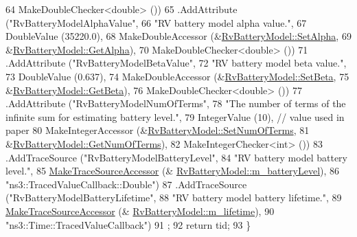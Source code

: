 \begin{DoxyCode}
64                    MakeDoubleChecker<double> ())
65     .AddAttribute (\textcolor{stringliteral}{"RvBatteryModelAlphaValue"},
66                    \textcolor{stringliteral}{"RV battery model alpha value."},
67                    DoubleValue (35220.0),
68                    MakeDoubleAccessor (&\hyperlink{classns3_1_1RvBatteryModel_ab7ed42697329357ed95a18cf2ec0d5d9}{RvBatteryModel::SetAlpha},
69                                        &\hyperlink{classns3_1_1RvBatteryModel_a91cdabc79e3f2a6facfe95202fa77e34}{RvBatteryModel::GetAlpha}),
70                    MakeDoubleChecker<double> ())
71     .AddAttribute (\textcolor{stringliteral}{"RvBatteryModelBetaValue"},
72                    \textcolor{stringliteral}{"RV battery model beta value."},
73                    DoubleValue (0.637),
74                    MakeDoubleAccessor (&\hyperlink{classns3_1_1RvBatteryModel_a82f89a01a1f487d3a71e9e21e5322286}{RvBatteryModel::SetBeta},
75                                        &\hyperlink{classns3_1_1RvBatteryModel_ad787cf29a82eea91384fe43146f64d28}{RvBatteryModel::GetBeta}),
76                    MakeDoubleChecker<double> ())
77     .AddAttribute (\textcolor{stringliteral}{"RvBatteryModelNumOfTerms"},
78                    \textcolor{stringliteral}{"The number of terms of the infinite sum for estimating battery level."},
79                    IntegerValue (10),   \textcolor{comment}{// value used in paper}
80                    MakeIntegerAccessor (&\hyperlink{classns3_1_1RvBatteryModel_a23db3b707a4885248157b96db2ad600d}{RvBatteryModel::SetNumOfTerms},
81                                         &\hyperlink{classns3_1_1RvBatteryModel_ac019bceefdd171250deedee5b24d90af}{RvBatteryModel::GetNumOfTerms}),
82                    MakeIntegerChecker<int> ())
83     .AddTraceSource (\textcolor{stringliteral}{"RvBatteryModelBatteryLevel"},
84                      \textcolor{stringliteral}{"RV battery model battery level."},
85                      \hyperlink{group__tracing_gab21a770b9855af4e8f69f7531ea4a6b0}{MakeTraceSourceAccessor} (&
      \hyperlink{classns3_1_1RvBatteryModel_af8c48353c513a2279115e52927b479a0}{RvBatteryModel::m\_batteryLevel}),
86                      \textcolor{stringliteral}{"ns3::TracedValueCallback::Double"})
87     .AddTraceSource (\textcolor{stringliteral}{"RvBatteryModelBatteryLifetime"},
88                      \textcolor{stringliteral}{"RV battery model battery lifetime."},
89                      \hyperlink{group__tracing_gab21a770b9855af4e8f69f7531ea4a6b0}{MakeTraceSourceAccessor} (&
      \hyperlink{classns3_1_1RvBatteryModel_aab2f6462269e44fda1b9425a6cb8bdf6}{RvBatteryModel::m\_lifetime}),
90                      \textcolor{stringliteral}{"ns3::Time::TracedValueCallback"})
91   ;
92   \textcolor{keywordflow}{return} tid;
93 \}
\end{DoxyCode}


